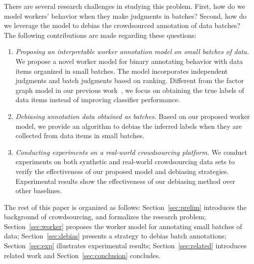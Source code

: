 There are several research challenges in studying this problem.
First, how do we model workers' behavior when they make judgments in batches?
Second, how do we leverage the model to debias the crowdsourced annotation of data batches?
The following contributions are made regarding these questions:
\begin{enumerate}
  \item \emph{Proposing an interpretable worker annotation model on small batches of data.}
        We propose a novel worker model for binary annotating behavior with data items organized in small batches.
        The model incorporates independent judgments and batch judgments based on ranking.
        Different from the factor graph model in our previous work~\cite{zhuang:wsdm2015},
        we focus on obtaining the true labels of data items instead of improving classifier performance.
  \item \emph{Debiasing annotation data obtained as batches.}
        Based on our proposed worker model, we provide an algorithm to debias the inferred labels
        when they are collected from data items in small batches.
  \item \emph{Conducting experiments on a real-world crowdsourcing platform.}
        We conduct experiments on both synthetic and real-world crowdsourcing data sets
        to verify the effectiveness of our proposed model and debiasing strategies.
        Experimental results show the effectiveness of our debiasing method over other baselines.
\end{enumerate}

The rest of this paper is organized as follows:
Section~\ref{sec:prelim} introduces the background of crowdsourcing, and formalizes the research problem;
Section~\ref{sec:worker} proposes the worker model for annotating small batches of data;
Section~\ref{sec:debias} presents a strategy to debias batch annotations;
Section~\ref{sec:exp} illustrates experimental results;
Section~\ref{sec:related} introduces related work and Section~\ref{sec:conclusion} concludes.






